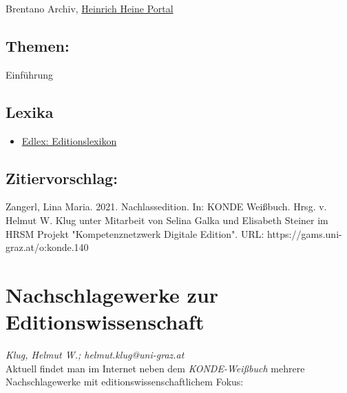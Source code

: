 \documentclass{article}
\begin{document}
{                           Brentano Archiv}, \href{http://www.hhp.uni-trier.de/Projekte/HHP/}{Heinrich Heine Portal}\subsection*{Themen:}Einführung\subsection*{Lexika}\begin{itemize}\item \href{https://edlex.de/index.php?title=Nachlassedition}{Edlex: Editionslexikon}\end{itemize}\subsection*{Zitiervorschlag:}Zangerl, Lina Maria. 2021. Nachlassedition. In: KONDE Weißbuch. Hrsg. v. Helmut W. Klug unter Mitarbeit von Selina Galka und Elisabeth Steiner im HRSM Projekt "Kompetenznetzwerk Digitale Edition". URL: https://gams.uni-graz.at/o:konde.140\newpage\section*{Nachschlagewerke zur Editionswissenschaft} \emph{Klug, Helmut W.; helmut.klug@uni-graz.at }\\
        
    Aktuell findet man im Internet neben dem \emph{KONDE-Weißbuch}
                  mehrere Nachschlagewerke mit editionswissenschaftlichem Fokus:\\
            
\end{document}
